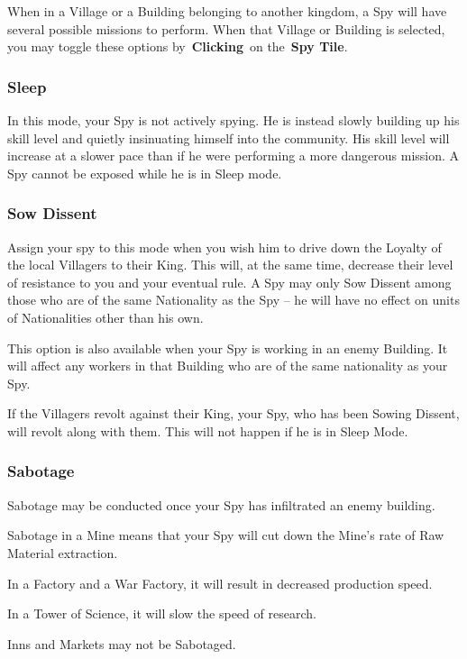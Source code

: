 When in a Village or a Building belonging to another kingdom, a Spy will have several possible missions to perform. When that Village or Building is selected, you may toggle these options by \textbf{Clicking} on the \textbf{Spy Tile}.

\subsubsection{Sleep}

In this mode, your Spy is not actively spying. He is instead slowly building up his skill level and quietly insinuating himself into the community. His skill level will increase at a slower pace than if he were performing a more dangerous mission. A Spy cannot be exposed while he is in Sleep mode.

\subsubsection{Sow Dissent}

Assign your spy to this mode when you wish him to drive down the Loyalty of the local Villagers to their King. This will, at the same time, decrease their level of resistance to you and your eventual rule. A Spy may only Sow Dissent among those who are of the same Nationality as the Spy -- he will have no effect on units of Nationalities other than his own.

This option is also available when your Spy is working in an enemy Building. It will affect any workers in that Building who are of the same nationality as your Spy.

If the Villagers revolt against their King, your Spy, who has been Sowing Dissent, will revolt along with them. This will not happen if he is in Sleep Mode.

\subsubsection{Sabotage}

Sabotage may be conducted once your Spy has infiltrated an enemy building.

Sabotage in a Mine means that your Spy will cut down the Mine’s rate of Raw Material extraction.

In a Factory and a War Factory, it will result in decreased production speed.

In a Tower of Science, it will slow the speed of research.

Inns and Markets may not be Sabotaged.

